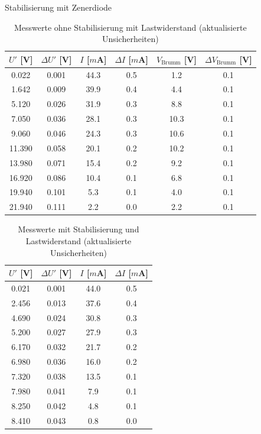 \documentclass{article}
\theoremstyle{definition}
\begin{document}
\begin{aufgabe}{Stabilisierung mit Zenerdiode}
\begin{table}[h!]
\centering
\begin{tabular}{|c|c|c|c|c|c|}
\hline
\textbf{$U'$ [V]} & \textbf{$\Delta U'$ [V]} & \textbf{$I$ [$m$A]} & \textbf{$\Delta I$ [$m$A]} & \textbf{$V_\text{Brumm}$ [V]} & \textbf{$\Delta V_\text{Brumm}$ [V]} \\
\hline
0.022 & 0.001 & 44.3 & 0.5 & 1.2 & 0.1 \\
1.642 & 0.009 & 39.9 & 0.4 & 4.4 & 0.1 \\
5.120 & 0.026 & 31.9 & 0.3 & 8.8 & 0.1 \\
7.050 & 0.036 & 28.1 & 0.3 & 10.3 & 0.1 \\
9.060 & 0.046 & 24.3 & 0.3 & 10.6 & 0.1 \\
11.390 & 0.058 & 20.1 & 0.2 & 10.2 & 0.1 \\
13.980 & 0.071 & 15.4 & 0.2 & 9.2 & 0.1 \\
16.920 & 0.086 & 10.4 & 0.1 & 6.8 & 0.1 \\
19.940 & 0.101 & 5.3 & 0.1 & 4.0 & 0.1 \\
21.940 & 0.111 & 2.2 & 0.0 & 2.2 & 0.1 \\
\hline
\end{tabular}
\caption{Messwerte ohne Stabilisierung mit Lastwiderstand (aktualisierte Unsicherheiten)}
\label{tab:Lastwiderstand_mit_Fehlern}
\end{table}



\begin{table}[h!]
\centering
\begin{tabular}{|c|c|c|c|}
\hline
\textbf{$U'$ [V]} & \textbf{$\Delta U'$ [V]} & \textbf{$I$ [$m$A]} & \textbf{$\Delta I$ [$m$A]} \\
\hline
0.021 & 0.001 & 44.0 & 0.5 \\
2.456 & 0.013 & 37.6 & 0.4 \\
4.690 & 0.024 & 30.8 & 0.3 \\
5.200 & 0.027 & 27.9 & 0.3 \\
6.170 & 0.032 & 21.7 & 0.2 \\
6.980 & 0.036 & 16.0 & 0.2 \\
7.320 & 0.038 & 13.5 & 0.1 \\
7.980 & 0.041 & 7.9 & 0.1 \\
8.250 & 0.042 & 4.8 & 0.1 \\
8.410 & 0.043 & 0.8 & 0.0 \\
\hline
\end{tabular}
\caption{Messwerte mit Stabilisierung und Lastwiderstand (aktualisierte Unsicherheiten)}
\label{tab:Stabilisierung_mit_Fehlern}
\end{table}



\end{aufgabe}
\end{document}

